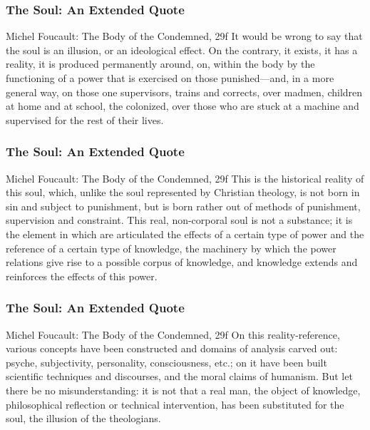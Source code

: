 \documentclass[xcolor=dvipsnames]{beamer}
\begin{document}
\begin{frame}
  \frametitle{The Soul: An Extended Quote}
  \begin{block}{Michel Foucault: The Body of the Condemned, 29f}
    It would be wrong to say that the soul is an illusion, or an
    ideological effect. On the contrary, it exists, it has a reality,
    it is produced permanently around, on, within the body by the
    functioning of a power that is exercised on those punished---and,
    in a more general way, on those one supervisors, trains and
    corrects, over madmen, children at home and at school, the
    colonized, over those who are stuck at a machine and supervised
    for the rest of their lives.
  \end{block}
\end{frame}

\begin{frame}
  \frametitle{The Soul: An Extended Quote}
  \begin{block}{Michel Foucault: The Body of the Condemned, 29f}
    This is the historical reality of this soul, which, unlike the
    soul represented by Christian theology, is not born in sin and
    subject to punishment, but is born rather out of methods of
    punishment, supervision and constraint. This real, non-corporal
    soul is not a substance; it is the element in which are
    articulated the effects of a certain type of power and the
    reference of a certain type of knowledge, the machinery by which
    the power relations give rise to a possible corpus of knowledge,
    and knowledge extends and reinforces the effects of this power.
  \end{block}
\end{frame}

\begin{frame}
  \frametitle{The Soul: An Extended Quote}
  \begin{block}{Michel Foucault: The Body of the Condemned, 29f}
    On this reality-reference, various concepts have been constructed
    and domains of analysis carved out: psyche, subjectivity,
    personality, consciousness, etc.; on it have been built scientific
    techniques and discourses, and the moral claims of humanism. But
    let there be no misunderstanding: it is not that a real man, the
    object of knowledge, philosophical reflection or technical
    intervention, has been substituted for the soul, the illusion of
    the theologians.
  \end{block}
\end{frame}
\end{document}
